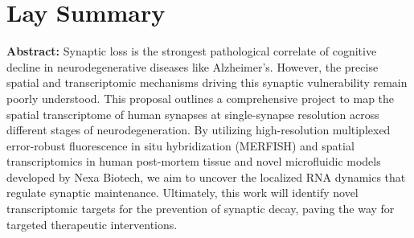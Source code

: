 \section*{Lay Summary}
\begin{tcolorbox}[
    colback=primarycolor!5,
    colframe=primarycolor!60,
    arc=4pt,
    leftrule=4pt,
    rightrule=0.5pt,
    toprule=0.5pt,
    bottomrule=0.5pt,
    left=12pt,
    right=12pt,
    top=10pt,
    bottom=10pt
]
    \noindent\textbf{Abstract: } Synaptic loss is the strongest pathological correlate of cognitive decline in neurodegenerative diseases like Alzheimer's. However, the precise spatial and transcriptomic mechanisms driving this synaptic vulnerability remain poorly understood. This proposal outlines a comprehensive project to map the spatial transcriptome of human synapses at single-synapse resolution across different stages of neurodegeneration. By utilizing high-resolution multiplexed error-robust fluorescence in situ hybridization (MERFISH) and spatial transcriptomics in human post-mortem tissue and novel microfluidic models developed by Nexa Biotech, we aim to uncover the localized RNA dynamics that regulate synaptic maintenance. Ultimately, this work will identify novel transcriptomic targets for the prevention of synaptic decay, paving the way for targeted therapeutic interventions.
\end{tcolorbox}
